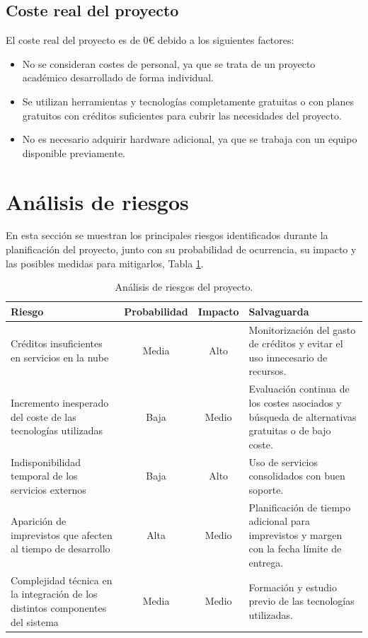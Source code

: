     \subsection{Coste real del proyecto}
        El coste real del proyecto es de 0€ debido a los siguientes factores: 
        \begin{itemize}
            \item No se consideran costes de personal, ya que se trata de un proyecto académico desarrollado de forma individual.
            \item Se utilizan herramientas y tecnologías completamente gratuitas o con planes gratuitos con créditos suficientes para cubrir las necesidades del proyecto.
            \item No es necesario adquirir hardware adicional, ya que se trabaja con un equipo disponible previamente.
        \end{itemize}
        

\section{Análisis de riesgos}
    En esta sección se muestran los principales riesgos identificados durante la planificación del proyecto, junto con su probabilidad de ocurrencia, su impacto y las posibles medidas para mitigarlos, Tabla \ref{tab:3.2}. 

    \begin{table}[H]
        \centering
        \begin{tabular}{| p{4.5cm} | c | c | p{7cm} |}
            \hline
            \textbf{Riesgo} & \textbf{Probabilidad} & \textbf{Impacto} & \textbf{Salvaguarda} \\ \hline
            Créditos insuficientes en servicios en la nube & Media & Alto & Monitorización del gasto de créditos y evitar el uso innecesario de recursos. \\ \hline
            Incremento inesperado del coste de las tecnologías utilizadas & Baja & Medio & Evaluación continua de los costes asociados y búsqueda de alternativas gratuitas o de bajo coste. \\ \hline
            Indisponibilidad temporal de los servicios externos & Baja & Alto & Uso de servicios consolidados con buen soporte. \\ \hline
            Aparición de imprevistos que afecten al tiempo de desarrollo & Alta & Medio & Planificación de tiempo adicional para imprevistos y margen con la fecha límite de entrega. \\ \hline
            Complejidad técnica en la integración de los distintos componentes del sistema & Media & Medio & Formación y estudio previo de las tecnologías utilizadas. \\ \hline
        \end{tabular}
        \caption{Análisis de riesgos del proyecto.}
        \label{tab:3.2}
    \end{table}

